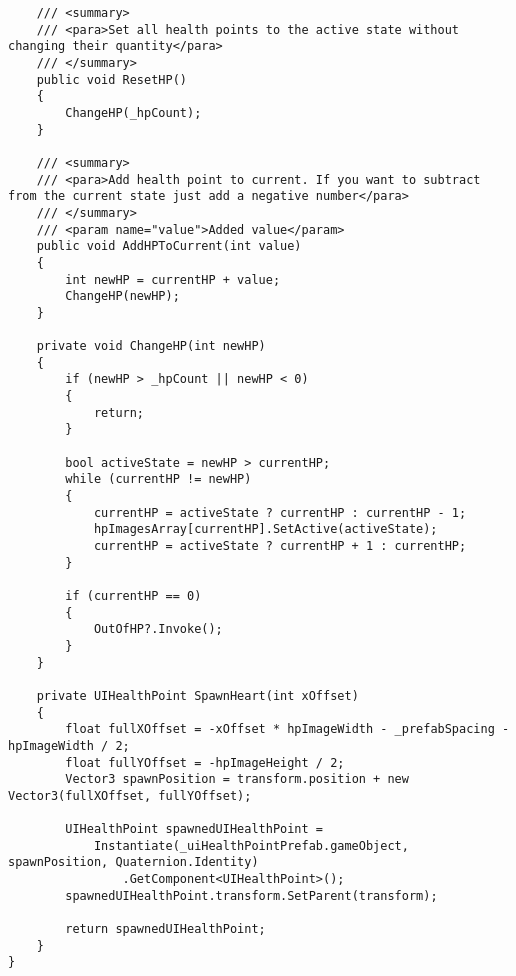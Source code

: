 \begin{verbatim}
    /// <summary>
    /// <para>Set all health points to the active state without changing their quantity</para>
    /// </summary>
    public void ResetHP()
    {
        ChangeHP(_hpCount);
    }

    /// <summary>
    /// <para>Add health point to current. If you want to subtract from the current state just add a negative number</para>
    /// </summary>
    /// <param name="value">Added value</param>
    public void AddHPToCurrent(int value)
    {
        int newHP = currentHP + value;
        ChangeHP(newHP);
    }

    private void ChangeHP(int newHP)
    {
        if (newHP > _hpCount || newHP < 0)
        {
            return;
        }

        bool activeState = newHP > currentHP;
        while (currentHP != newHP)
        {
            currentHP = activeState ? currentHP : currentHP - 1;
            hpImagesArray[currentHP].SetActive(activeState);
            currentHP = activeState ? currentHP + 1 : currentHP;
        }

        if (currentHP == 0)
        {
            OutOfHP?.Invoke();
        }
    }

    private UIHealthPoint SpawnHeart(int xOffset)
    {
        float fullXOffset = -xOffset * hpImageWidth - _prefabSpacing - hpImageWidth / 2;
        float fullYOffset = -hpImageHeight / 2;
        Vector3 spawnPosition = transform.position + new Vector3(fullXOffset, fullYOffset);

        UIHealthPoint spawnedUIHealthPoint =
            Instantiate(_uiHealthPointPrefab.gameObject, spawnPosition, Quaternion.Identity)
                .GetComponent<UIHealthPoint>();
        spawnedUIHealthPoint.transform.SetParent(transform);

        return spawnedUIHealthPoint;
    }
}
\end{verbatim}

